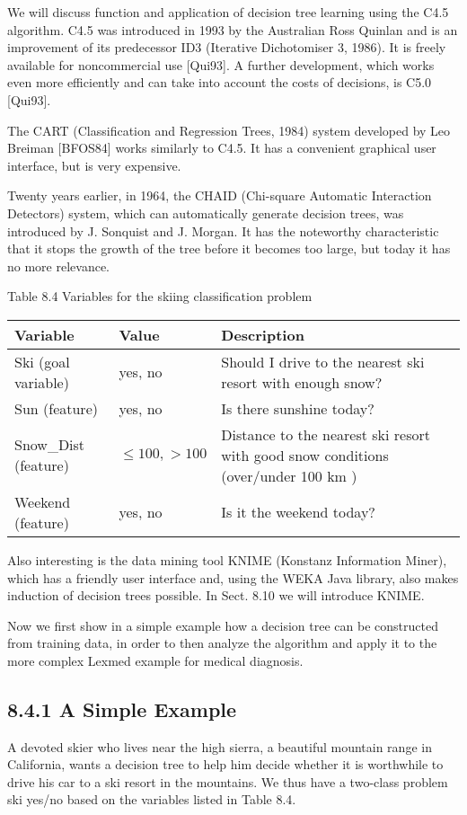 \documentclass[10pt]{article}
\begin{document}
We will discuss function and application of decision tree learning using the C4.5 algorithm. C4.5 was introduced in 1993 by the Australian Ross Quinlan and is an improvement of its predecessor ID3 (Iterative Dichotomiser 3, 1986). It is freely available for noncommercial use [Qui93]. A further development, which works even more efficiently and can take into account the costs of decisions, is C5.0 [Qui93].

The CART (Classification and Regression Trees, 1984) system developed by Leo Breiman [BFOS84] works similarly to C4.5. It has a convenient graphical user interface, but is very expensive.

Twenty years earlier, in 1964, the CHAID (Chi-square Automatic Interaction Detectors) system, which can automatically generate decision trees, was introduced by J. Sonquist and J. Morgan. It has the noteworthy characteristic that it stops the growth of the tree before it becomes too large, but today it has no more relevance.

Table 8.4 Variables for the skiing classification problem

\begin{center}
\begin{tabular}{|l|l|l|}
\hline
Variable & Value & Description \\
\hline
Ski (goal variable) & yes, no & Should I drive to the nearest ski resort with enough snow? \\
\hline
Sun (feature) & yes, no & Is there sunshine today? \\
\hline
Snow\_Dist (feature) & $\leq 100,>100$ & Distance to the nearest ski resort with good snow conditions (over/under 100 km ) \\
\hline
Weekend (feature) & yes, no & Is it the weekend today? \\
\hline
\end{tabular}
\end{center}

Also interesting is the data mining tool KNIME (Konstanz Information Miner), which has a friendly user interface and, using the WEKA Java library, also makes induction of decision trees possible. In Sect. 8.10 we will introduce KNIME.

Now we first show in a simple example how a decision tree can be constructed from training data, in order to then analyze the algorithm and apply it to the more complex Lexmed example for medical diagnosis.

\subsection*{8.4.1 A Simple Example}
A devoted skier who lives near the high sierra, a beautiful mountain range in California, wants a decision tree to help him decide whether it is worthwhile to drive his car to a ski resort in the mountains. We thus have a two-class problem ski yes/no based on the variables listed in Table 8.4.
\end{document}
